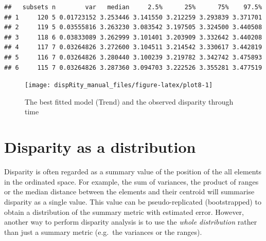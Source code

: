 \documentclass[]{book}
\newenvironment{Shaded}{\begin{snugshade}}{\end{snugshade}}
\newcommand{\CommentTok}[1]{\textcolor[rgb]{0.56,0.35,0.01}{\textit{#1}}}
\newcommand{\DataTypeTok}[1]{\textcolor[rgb]{0.13,0.29,0.53}{#1}}
\newcommand{\KeywordTok}[1]{\textcolor[rgb]{0.13,0.29,0.53}{\textbf{#1}}}
\newcommand{\NormalTok}[1]{#1}
\newcommand{\OtherTok}[1]{\textcolor[rgb]{0.56,0.35,0.01}{#1}}
\newcommand{\StringTok}[1]{\textcolor[rgb]{0.31,0.60,0.02}{#1}}
\begin{document}
\begin{verbatim}
##   subsets n        var   median     2.5%      25%      75%    97.5%
## 1     120 5 0.01723152 3.253446 3.141550 3.212259 3.293839 3.371701
## 2     119 5 0.03555816 3.263230 3.083542 3.197505 3.324500 3.440508
## 3     118 6 0.03833089 3.262999 3.101401 3.203909 3.332642 3.440208
## 4     117 7 0.03264826 3.272600 3.104511 3.214542 3.330617 3.442819
## 5     116 7 0.03264826 3.280440 3.100239 3.219782 3.342742 3.475893
## 6     115 7 0.03264826 3.287360 3.094703 3.222526 3.355281 3.477519
\end{verbatim}

\begin{Shaded}
\end{Shaded}

\begin{figure}

{\centering \texttt{[image: dispRity\_manual\_files/figure-latex/plot8-1]} 

}

\caption{The best fitted model (Trend) and the observed disparity through time}\label{fig:plot8}
\end{figure}

\hypertarget{disparity-distribution}{%
\section{Disparity as a distribution}\label{disparity-distribution}}

Disparity is often regarded as a summary value of the position of the all elements in the ordinated space.
For example, the sum of variances, the product of ranges or the median distance between the elements and their centroid will summarise disparity as a single value.
This value can be pseudo-replicated (bootstrapped) to obtain a distribution of the summary metric with estimated error.
However, another way to perform disparity analysis is to use the \emph{whole distribution} rather than just a summary metric (e.g.~the variances or the ranges).
\end{document}
